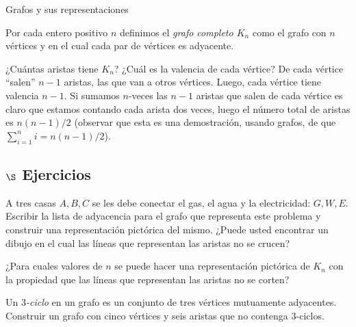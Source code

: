 \begin{section}{Grafos y sus representaciones}
\begin{definicion}
Por cada entero positivo $n$ definimos el \textit{grafo completo   $K_n$} como el grafo con $n$ vértices y en el cual cada par de vértices es adyacente. 
\end{definicion}


¿Cuántas aristas tiene $K_n$? ¿Cuál es la valencia de cada vértice? De cada vértice ``salen'' $n-1$ aristas, las que van a otros vértices. Luego, cada vértice tiene valencia $n-1$. Si  sumamos $n$-veces las $n-1$ aristas que salen de cada vértice es claro que estamos contando cada arista dos veces, luego el número total de aristas es $n(n-1)/2$ (observar que esta es una demostración, usando  grafos, de que $\sum_{i=1}^n i = n(n-1)/2$).


\subsection*{$\S$ Ejercicios}
\begin{enumex}
\item A tres casas $A,B,C$ se les debe conectar el gas, el agua y la electricidad: $G,W,E$. Escribir la lista de adyacencia para el grafo que representa este problema y construir una representación pictórica del mismo. ¿Puede usted encontrar un dibujo en el cual las líneas que representan las aristas no se crucen?
\item  ¿Para cuales valores de $n$ se puede hacer una representación pictórica
de $K_n$ con la propiedad que las líneas que representan las aristas no se corten? 
\item Un \textit{{$3$-ciclo}} en un grafo es un conjunto de tres vértices mutuamente adyacentes. Construir un grafo con cinco vértices y seis aristas que no contenga $3$-ciclos.
\end{enumex}

\end{section}


